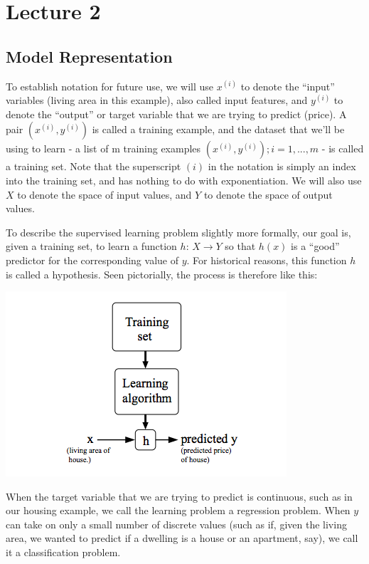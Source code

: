\documentclass[UTF8]{article}
\begin{document}
\section{Lecture 2}

\subsection{Model Representation}

To establish notation for future use, we will use $x^{(i)}$ to denote the ``input'' variables (living area in this example), also called input features, and $y^{(i)}$ to denote the ``output'' or target variable that we are trying to predict (price). A pair $(x^{(i)},y^{(i)})$ is called a training example, and the dataset that we'll be using to learn - a list of m training examples $(x^{(i)},y^{(i)}); i=1,...,m$ - is called a training set. Note that the superscript $(i)$ in the notation is simply an index into the training set, and has nothing to do with exponentiation. We will also use $X$ to denote the space of input values, and $Y$ to denote the space of output values.

To describe the supervised learning problem slightly more formally, our goal is, given a training set, to learn a function $h$: $X \to Y$ so that $h(x)$ is a ``good'' predictor for the corresponding value of $y$. For historical reasons, this function $h$ is called a hypothesis. Seen pictorially, the process is therefore like this:

\includegraphics[width = .8\textwidth]{NotePics/2_1_1.png}

When the target variable that we are trying to predict is continuous, such as in our housing example, we call the learning problem a regression problem. When $y$ can take on only a small number of discrete values (such as if, given the living area, we wanted to predict if a dwelling is a house or an apartment, say), we call it a classification problem.
\end{document}
